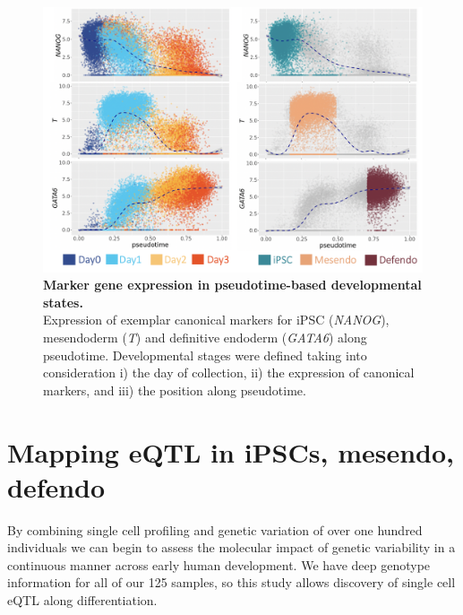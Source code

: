 \begin{figure}[h]
\centering
\includegraphics[width=14cm]{Chapter4/Fig/endodiff_stages.png}
\caption[Developmental stages]{\textbf{Marker gene expression in pseudotime-based developmental states.}\\
Expression of exemplar canonical markers for iPSC (\textit{NANOG}), mesendoderm (\textit{T}) and definitive endoderm (\textit{GATA6}) along pseudotime.
Developmental stages were defined taking into consideration i) the day of collection, ii) the expression of canonical markers, and iii) the position along pseudotime.}
\label{fig:endodiff_stages}
\end{figure}

\section{Mapping eQTL in iPSCs, mesendo, defendo}
\label{sec:endodiff_eqtl}

By combining single cell profiling and genetic variation of over one hundred individuals we can begin to assess the molecular impact of genetic variability in a continuous manner across early human development.
We have deep genotype information for all of our 125 samples, so this study allows discovery of single cell eQTL along differentiation. 



